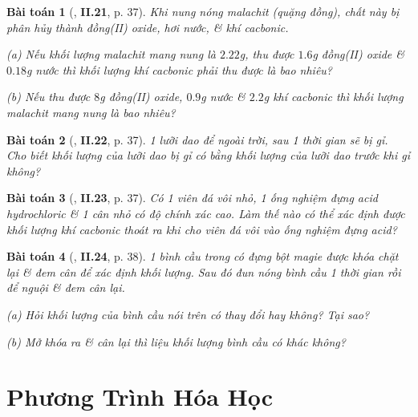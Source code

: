 \documentclass{article}
\numberwithin{equation}{section}
\newtheorem{baitoan}{Bài toán}
\begin{document}
\begin{baitoan}[\cite{Truong2021}, \textbf{II.21}, p. 37]
	Khi nung nóng malachit (quặng đồng), chất này bị phân hủy thành đồng(II) oxide, hơi nước, \& khí cacbonic.
	\begin{enumerate*}
		\item[(a)] Nếu khối lượng malachit  mang nung là $2.22$\emph{g}, thu được $1.6$\emph{g} đồng(II) oxide \& $0.18$\emph{g} nước thì khối lượng khí cacbonic phải thu được là bao nhiêu?
		\item[(b)] Nếu thu được $8$\emph{g} đồng(II) oxide, $0.9$\emph{g} nước \& $2.2$\emph{g} khí cacbonic thì khối lượng malachit mang nung là bao nhiêu?
	\end{enumerate*}
\end{baitoan}

\begin{baitoan}[\cite{Truong2021}, \textbf{II.22}, p. 37]
	1 lưỡi dao để ngoài trời, sau 1 thời gian sẽ bị gỉ. Cho biết khối lượng của lưỡi dao bị gỉ có bằng khối lượng của lưỡi dao trước khi gỉ không?
\end{baitoan}

\begin{baitoan}[\cite{Truong2021}, \textbf{II.23}, p. 37]
	Có 1 viên đá vôi nhỏ, 1 ống nghiệm đựng acid hydrochloric \& 1 cân nhỏ có độ chính xác cao. Làm thế nào có thể xác định được khối lượng khí cacbonic thoát ra khi cho viên đá vôi vào ống nghiệm đựng acid?
\end{baitoan}

\begin{baitoan}[\cite{Truong2021}, \textbf{II.24}, p. 38]
	1 bình cầu trong có đựng bột magie được khóa chặt lại \& đem cân để xác định khối lượng. Sau đó đun nóng bình cầu 1 thời gian rồi để nguội \& đem cân lại.
	\begin{enumerate*}
		\item[(a)] Hỏi khối lượng của bình cầu nói trên có thay đổi hay không? Tại sao?
		\item[(b)] Mở khóa ra \& cân lại thì liệu khối lượng bình cầu có khác không?
	\end{enumerate*}
\end{baitoan}


\section{Phương Trình Hóa Học}


\printbibliography[heading=bibintoc]
	
\end{document}
